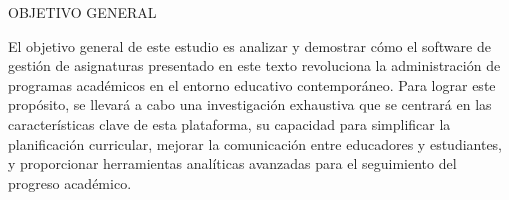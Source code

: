 















OBJETIVO GENERAL


El objetivo general de este estudio es analizar y demostrar cómo el software de gestión de asignaturas presentado en este texto
revoluciona la administración de programas académicos en el entorno educativo contemporáneo. Para lograr este propósito, se llevará a
cabo una investigación exhaustiva que se centrará en las características clave de esta plataforma, su capacidad para simplificar la
planificación curricular, mejorar la comunicación entre educadores y estudiantes, y proporcionar herramientas analíticas avanzadas para
el seguimiento del progreso académico. 
